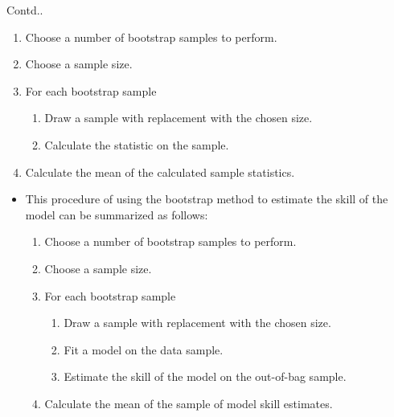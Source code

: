 \documentclass{beamer}
\begin{document}
\begin{frame}{Contd..}
	\begin{enumerate}
			\item Choose a number of bootstrap samples to perform.
			\item Choose a sample size.
			\item For each bootstrap sample
			\begin{enumerate}	
				\item Draw a sample with replacement with the chosen size.
				\item Calculate the statistic on the sample.
			\end{enumerate} 
			\item Calculate the mean of the calculated sample statistics.
	\end{enumerate}
	\begin{itemize}
		\item This procedure of using the bootstrap method to estimate the skill of the model can be summarized as follows:
		\begin{enumerate}
			\item Choose a number of bootstrap samples to perform.
			\item Choose a sample size.
			\item For each bootstrap sample
			\begin{enumerate}	
				\item Draw a sample with replacement with the chosen size.
				\item Fit a model on the data sample.
				\item Estimate the skill of the model on the out-of-bag sample.
			\end{enumerate} 
			\item Calculate the mean of the sample of model skill estimates.
		\end{enumerate}
	\end{itemize}
\end{frame}
\end{document}

